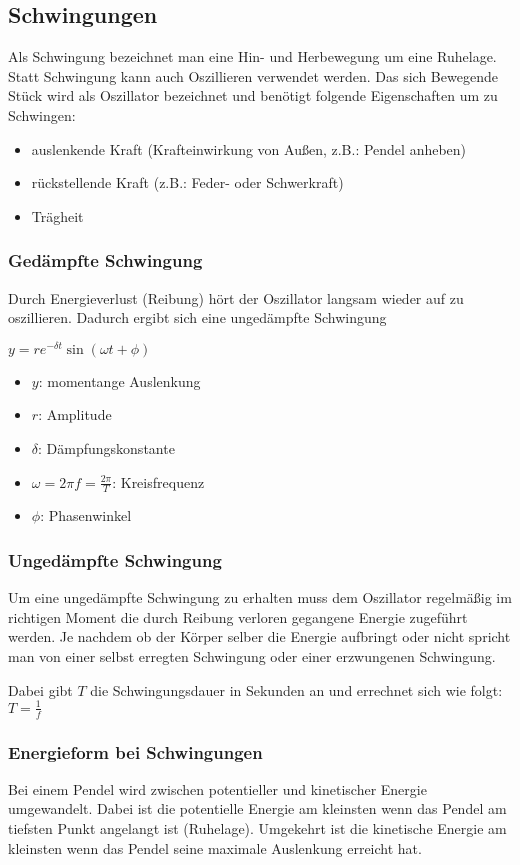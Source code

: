 \documentclass[../document.tex]{subfiles}
\begin{document}
\subsection{Schwingungen}

Als Schwingung bezeichnet man eine Hin- und Herbewegung um eine Ruhelage.
Statt Schwingung kann auch Oszillieren verwendet werden.
Das sich Bewegende Stück wird als Oszillator bezeichnet und benötigt folgende Eigenschaften um zu Schwingen:
\begin{itemize}
	\item auslenkende Kraft (Krafteinwirkung von Außen, z.B.: Pendel anheben)
	\item rückstellende Kraft (z.B.: Feder- oder Schwerkraft)
	\item Trägheit
\end{itemize}

\subsubsection{Gedämpfte Schwingung}
Durch Energieverlust (Reibung) hört der Oszillator langsam wieder auf zu oszillieren. Dadurch ergibt sich eine ungedämpfte Schwingung

$y = r e^{-\delta t} \sin(\omega t + \phi)$
\begin{itemize}
	\item $y$: momentange Auslenkung
	\item $r$: Amplitude
	\item $\delta$: Dämpfungskonstante
	\item $\omega = 2\pi f = \frac{2\pi}{T}$: Kreisfrequenz
	\item $\phi$: Phasenwinkel
\end{itemize}

\subsubsection{Ungedämpfte Schwingung}
Um eine ungedämpfte Schwingung zu erhalten muss dem Oszillator regelmäßig im richtigen Moment die durch Reibung verloren gegangene Energie zugeführt werden.
Je nachdem ob der Körper selber die Energie aufbringt oder nicht spricht man von einer selbst erregten Schwingung oder einer erzwungenen Schwingung.

Dabei gibt $T$ die Schwingungsdauer in Sekunden an und errechnet sich wie folgt:
$T = \frac{1}{f}$

\subsubsection{Energieform bei Schwingungen}
Bei einem Pendel wird zwischen potentieller und kinetischer Energie umgewandelt. Dabei ist die potentielle Energie am kleinsten wenn das Pendel am tiefsten Punkt angelangt ist (Ruhelage). 
Umgekehrt ist die kinetische Energie am kleinsten wenn das Pendel seine maximale Auslenkung erreicht hat. 
\end{document}
